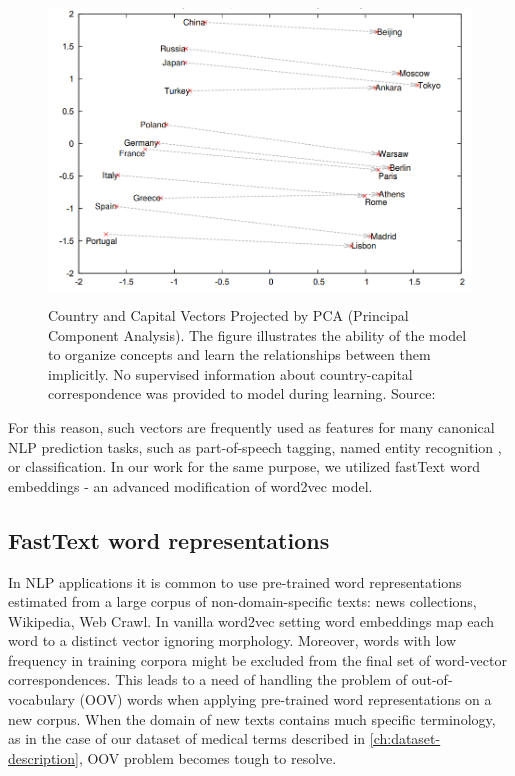 \begin{figure}[h]
    \centering
    \includegraphics[height=8cm]{Images/word2vec-property.png}
    \caption{Country and Capital Vectors Projected by PCA (Principal Component Analysis). The figure illustrates the ability of the model to organize concepts and learn the relationships between them implicitly. No supervised information about country-capital correspondence was provided to model during learning. Source: \citep{Mikolov-NIPS2013}}
    \label{fig:word2vec-property}
\end{figure} 
%
For this reason, such vectors are frequently used as features for many canonical NLP prediction tasks, such as part-of-speech tagging, named entity recognition \citep{Collobert:DBLP}, or classification. In our work for the same purpose, we utilized fastText word embeddings - an advanced modification of word2vec model.

\subsection{FastText word representations}
In NLP applications it is common to use pre-trained word representations estimated from a large corpus of non-domain-specific texts: news collections, Wikipedia, Web Crawl. In vanilla word2vec setting word embeddings map each word to a distinct vector ignoring morphology. Moreover, words with low frequency in training corpora might be excluded from the final set of word-vector correspondences. This leads to a need of handling the problem of out-of-vocabulary (OOV) words when applying pre-trained word representations on a new corpus. When the domain of new texts contains much specific terminology, as in the case of our dataset of medical terms described in \ref{ch:dataset-description}, OOV problem becomes tough to resolve.

